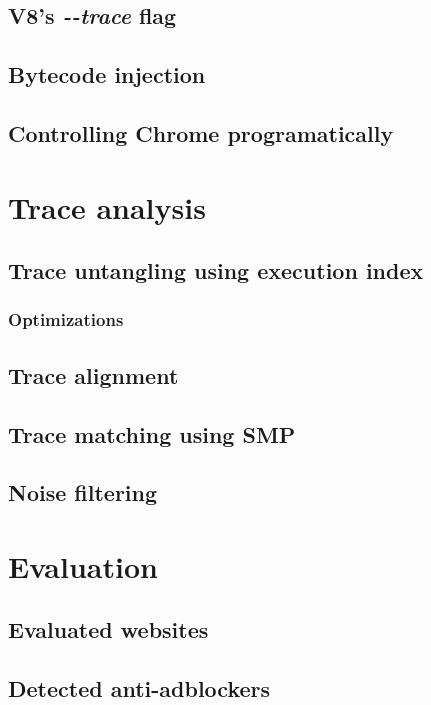 \documentclass[en]{pracamgr}
\begin{document}
\section{V8's \emph{-{}-trace} flag}
\section{Bytecode injection}
\section{Controlling Chrome programatically}

\chapter{Trace analysis}
\section{Trace untangling using execution index}
\subsection{Optimizations}

\section{Trace alignment}
\label{trace-alignment}

\section{Trace matching using SMP}
\section{Noise filtering}

\chapter{Evaluation}
\section{Evaluated websites}
\section{Detected anti-adblockers}

\lstlistoflistings
{}

{}

\end{document}
